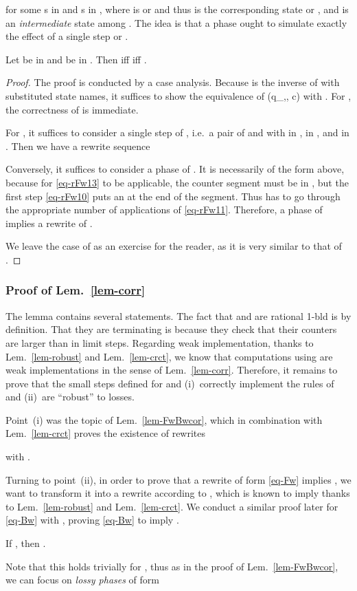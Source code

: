 for some s in  and s in
, where  is  or  and thus  is
the corresponding state  or , and
 is an \emph{intermediate} state among
.  The idea is that a
phase ought to simulate exactly the effect of a single step
 or .
\begin{lemma}\label{lem-FwBwcor}
  Let  be in  and  be in .  Then
   iff  iff .
\end{lemma}
\begin{proof}
  The proof is conducted by a case analysis.  Because  is the
  inverse of  with substituted state names, it suffices to show
  the equivalence of (q_\Fw\sep\sep
    c) with . For , the correctness of
   is immediate.

  For , it suffices to consider a single step of , i.e.\ a
  pair of  and
   with  in ,  in
  , and  in .  Then we have a
  rewrite sequence
  
  Conversely, it suffices to consider a phase of .  It
  is necessarily of the form above, because for \eqref{eq-rFw13} to be
  applicable, the counter segment must be in , but the
  first step \eqref{eq-rFw10} puts an  at the end of the
  segment.  Thus  has to go through the appropriate number of
  applications of \eqref{eq-rFw11}.  Therefore, a phase of
   implies a rewrite of .

  We leave the case of  as an exercise for the reader, as it is
  very similar to that of .
\end{proof}

\subsubsection{Proof of Lem.~\ref{lem-corr}}  The lemma contains
several statements.  The fact that  and  are rational 1-bld
is by definition.  That they are terminating is because they check
that their counters are larger than  in limit steps.
Regarding weak implementation, thanks to
Lem.~\ref{lem-robust} and Lem.~\ref{lem-crct}, we know that
computations using  are weak implementations in the sense of
Lem.~\ref{lem-corr}.  Therefore, it remains to prove that the small steps
defined for  and  (i)~correctly implement the rules of
 and (ii)~are ``robust'' to losses.

Point~(i) was the topic of Lem.~\ref{lem-FwBwcor}, which in
combination with Lem.~\ref{lem-crct} proves the existence of rewrites 

with .

Turning to point~(ii), in order to prove that a rewrite of
form \eqref{eq-Fw} implies , we want to transform
it into a rewrite according to , which is known to
imply  thanks to Lem.~\ref{lem-robust} and
Lem.~\ref{lem-crct}.  We conduct a similar proof later
for \eqref{eq-Bw} with ,
proving \eqref{eq-Bw} to imply .
\begin{claim}
  If , then
  .
\end{claim}
Note that this holds trivially for , thus as in the proof of
Lem.~\ref{lem-FwBwcor}, we can focus on \emph{lossy phases} of form

